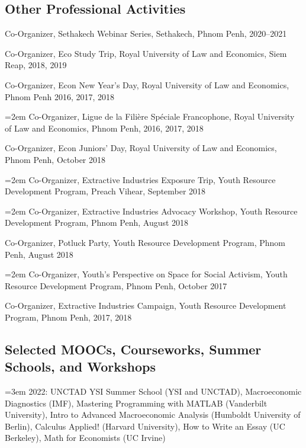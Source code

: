 \documentclass[10pt,a4paper]{article}
\begin{document}
\subsection*{Other Professional Activities}

	Co-Organizer, Sethakech Webinar Series, Sethakech, Phnom Penh, 2020--2021

	Co-Organizer, Eco Study Trip, Royal University of Law and Economics, Siem Reap, 2018, 2019

	Co-Organizer, Econ New Year's Day, Royal University of Law and Economics, Phnom Penh 2016, 2017, 2018

\hangindent=2em
	Co-Organizer, Ligue de la Filière Spéciale Francophone, Royal University of Law and Economics, Phnom Penh, 2016, 2017, 2018 
		
	Co-Organizer, Econ Juniors' Day, Royal University of Law and Economics, Phnom Penh, October 2018
		
\hangindent=2em
	Co-Organizer, Extractive Industries Exposure Trip, Youth Resource Development Program, Preach Vihear, September 2018

\hangindent=2em
	Co-Organizer, Extractive Industries Advocacy Workshop, Youth Resource Development Program, Phnom Penh, August 2018
		
	Co-Organizer, Potluck Party, Youth Resource Development Program, Phnom Penh, August 2018

\hangindent=2em
	Co-Organizer, Youth's Perspective on Space for Social Activism, Youth Resource Development Program, Phnom Penh, October 2017
		
	Co-Organizer, Extractive Industries Campaign, Youth Resource Development Program, Phnom Penh, 2017, 2018		

\subsection*{Selected MOOCs, Courseworks, Summer Schools, and Workshops}

\hangindent=3em
	2022: UNCTAD YSI Summer School (YSI and UNCTAD), Macroeconomic Diagnostics (IMF), Mastering Programming with MATLAB (Vanderbilt University), Intro to Advanced Macroeconomic Analysis (Humboldt University of Berlin), Calculus Applied! (Harvard University), How to Write an Essay (UC Berkeley), Math for Economists (UC Irvine)
\end{document}
